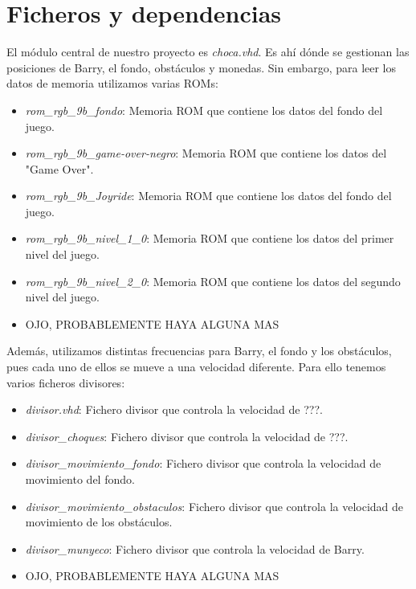 \documentclass[11pt, a4paper, spanish, openright, twoside]{book}
\begin{document}
\newpage
\mbox{}
\thispagestyle{empty}						%
\newpage


\tableofcontents 							%

\newpage
\mbox{}
\thispagestyle{empty}						%
\newpage


\vspace{3cm}


\section{Ficheros y dependencias}
El módulo central de nuestro proyecto es \textit{choca.vhd}. Es ahí dónde se gestionan las posiciones de Barry, el fondo, obstáculos y monedas. Sin embargo, para leer los datos de memoria utilizamos varias ROMs:
\begin{itemize}
\item \textit{rom_rgb_9b_fondo}: Memoria ROM que contiene los datos del fondo del juego.
\item \textit{rom_rgb_9b_game-over-negro}: Memoria ROM que contiene los datos del "Game Over".
\item \textit{rom_rgb_9b_Joyride}: Memoria ROM que contiene los datos del fondo del juego.
\item \textit{rom_rgb_9b_nivel_1_0}: Memoria ROM que contiene los datos del primer nivel del juego.
\item \textit{rom_rgb_9b_nivel_2_0}: Memoria ROM que contiene los datos del segundo nivel del juego.
\item OJO, PROBABLEMENTE HAYA ALGUNA MAS
\end{itemize}

Además, utilizamos distintas frecuencias para Barry, el fondo y los obstáculos, pues cada uno de ellos se mueve a una velocidad diferente. Para ello tenemos varios ficheros divisores:
\begin{itemize}
\item \textit{divisor.vhd}: Fichero divisor que controla la velocidad de ???.
\item \textit{divisor_choques}: Fichero divisor que controla la velocidad de ???.
\item \textit{divisor_movimiento_fondo}: Fichero divisor que controla la velocidad de movimiento del fondo.
\item \textit{divisor_movimiento_obstaculos}: Fichero divisor que controla la velocidad de movimiento de los obstáculos.
\item \textit{divisor_munyeco}: Fichero divisor que controla la velocidad de Barry.
\item OJO, PROBABLEMENTE HAYA ALGUNA MAS
\end{itemize}
\end{document}
